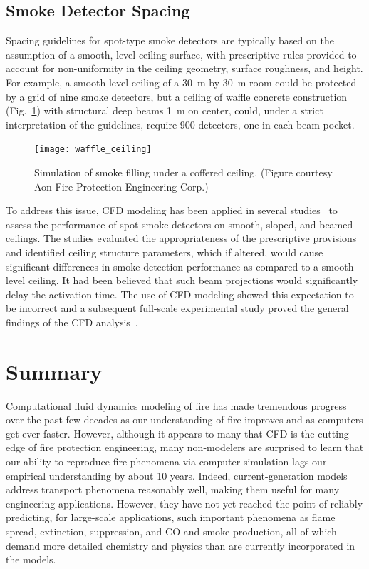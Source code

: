 \documentclass[graybox]{svmult}
\begin{document}
\subsection{Smoke Detector Spacing}

Spacing guidelines for spot-type smoke detectors are typically based on the assumption of a smooth, level ceiling surface, with prescriptive rules provided to account for non-uniformity in the ceiling geometry, surface roughness, and height. For example, a smooth level ceiling of a 30~m by 30~m room could be protected by a grid of nine smoke detectors, but a ceiling of waffle concrete construction (Fig.~\ref{waffle_ceiling}) with structural deep beams 1~m on center, could, under a strict interpretation of the guidelines, require 900 detectors, one in each beam pocket.
\begin{figure}[ht]
\texttt{[image: waffle\_ceiling]}
\caption{Simulation of smoke filling under a coffered ceiling. (Figure courtesy Aon Fire Protection Engineering Corp.)}
\label{waffle_ceiling}
\end{figure}
To address this issue, CFD modeling has been applied in several studies~\cite{O'Connor:NFPRF,Mealy:NFPRF} to assess the performance of spot smoke detectors on smooth, sloped, and beamed ceilings. The studies evaluated the appropriateness of the prescriptive provisions and identified ceiling structure parameters, which if altered, would cause significant differences in smoke detection performance as compared to a smooth level ceiling. It had been believed that such beam projections would significantly delay the activation time. The use of CFD modeling showed this expectation to be incorrect and a subsequent full-scale experimental study proved the general findings of the CFD analysis~\cite{Gottuk:2008}.







\section{Summary}

Computational fluid dynamics modeling of fire has made tremendous progress over the past few decades as our understanding of fire improves and as computers get ever faster. However, although it appears to many that CFD is the cutting edge of fire protection engineering, many non-modelers are surprised to learn that our ability to reproduce fire phenomena via computer simulation lags our empirical understanding by about 10 years. Indeed, current-generation models address transport phenomena reasonably well, making them useful for many engineering applications. However, they have not yet reached the point of reliably predicting, for large-scale applications, such important phenomena as flame spread, extinction, suppression, and CO and smoke production, all of which demand more detailed chemistry and physics than are currently incorporated in the models.
\end{document}
